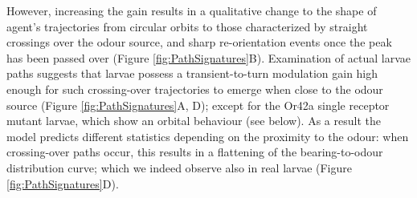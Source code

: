 \documentclass[11pt,a4paper]{article}
\newcommand{\todoKL}[1]{\todo[author=KL,color=blue!40, size=\tiny,inline]{#1}}
\begin{document}

However, increasing the gain results in a qualitative change to the shape  of agent's trajectories from circular orbits to those characterized by straight crossings over the odour source, and sharp re-orientation events once the peak has been passed over (Figure \ref{fig:PathSignatures}B). Examination of actual larvae paths suggests that larvae possess a transient-to-turn modulation gain high enough for such crossing-over trajectories to emerge when close to the odour source (Figure \ref{fig:PathSignatures}A, D); except for the Or42a single receptor mutant larvae, which show an orbital behaviour (see below). As a result the model predicts different statistics depending on the proximity to the odour: when crossing-over paths occur, this results in a flattening of the bearing-to-odour distribution curve; which we indeed observe also in real larvae (Figure \ref{fig:PathSignatures}D).
\end{document}
